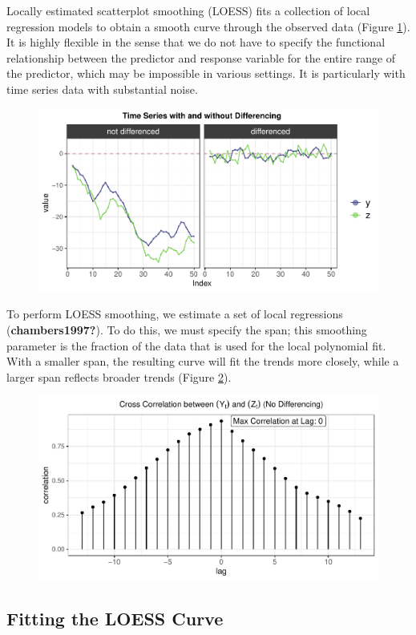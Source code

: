 \documentclass[12pt,twoside]{smiththesis}
\begin{document}
Locally estimated scatterplot smoothing (LOESS) fits a collection of local regression models to obtain a smooth curve through the observed data (Figure \ref{fig:loess}). It is highly flexible in the sense that we do not have to specify the functional relationship between the predictor and response variable for the entire range of the predictor, which may be impossible in various settings. It is particularly with time series data with substantial noise.
\begin{figure}
\centering
\includegraphics{thesis_files/figure-latex/unnamed-chunk-21-1.pdf}
\caption{\label{fig:unnamed-chunk-21}\label{fig:loess}}
\end{figure}
To perform LOESS smoothing, we estimate a set of local regressions (\textbf{chambers1997?}). To do this, we must specify the span; this smoothing parameter is the fraction of the data that is used for the local polynomial fit. With a smaller span, the resulting curve will fit the trends more closely, while a larger span reflects broader trends (Figure \ref{fig:smooth-spans}).
\begin{figure}
\centering
\includegraphics{thesis_files/figure-latex/unnamed-chunk-22-1.pdf}
\caption{\label{fig:unnamed-chunk-22}\label{fig:smooth-spans}}
\end{figure}
\hypertarget{fitting-the-loess-curve}{%
\subsection{Fitting the LOESS Curve}\label{fitting-the-loess-curve}}
\end{document}
